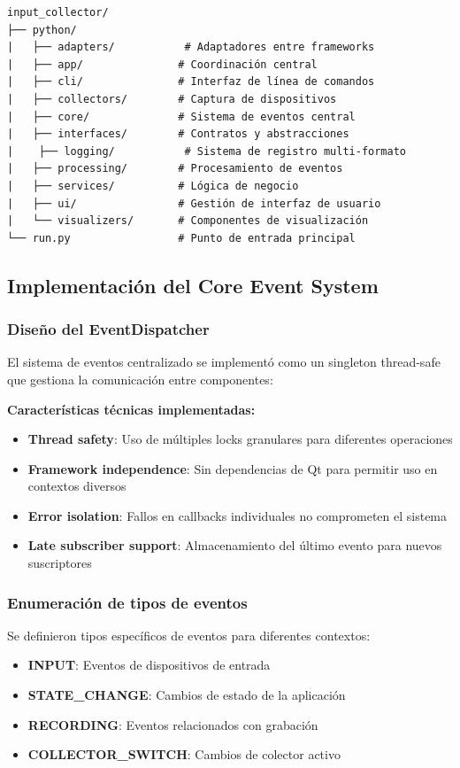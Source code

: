 \begin{verbatim}
input_collector/
├── python/
|   ├── adapters/           # Adaptadores entre frameworks
|   ├── app/               # Coordinación central
|   ├── cli/               # Interfaz de línea de comandos
|   ├── collectors/        # Captura de dispositivos
|   ├── core/              # Sistema de eventos central
|   ├── interfaces/        # Contratos y abstracciones
|    ├── logging/           # Sistema de registro multi-formato
|   ├── processing/        # Procesamiento de eventos
|   ├── services/          # Lógica de negocio
|   ├── ui/                # Gestión de interfaz de usuario
|   └── visualizers/       # Componentes de visualización
└── run.py                 # Punto de entrada principal
\end{verbatim}

\subsection{Implementación del Core Event System}
\label{subsec:implementacion_core_events_input}

\subsubsection{Diseño del EventDispatcher}

El sistema de eventos centralizado se implementó como un singleton thread-safe que gestiona la comunicación entre componentes:

\textbf{Características técnicas implementadas:}
\begin{itemize}
    \item \textbf{Thread safety}: Uso de múltiples locks granulares para diferentes operaciones
    \item \textbf{Framework independence}: Sin dependencias de Qt para permitir uso en contextos diversos
    \item \textbf{Error isolation}: Fallos en callbacks individuales no comprometen el sistema
    \item \textbf{Late subscriber support}: Almacenamiento del último evento para nuevos suscriptores
\end{itemize}

\subsubsection{Enumeración de tipos de eventos}

Se definieron tipos específicos de eventos para diferentes contextos:
\begin{itemize}
    \item \textbf{INPUT}: Eventos de dispositivos de entrada
    \item \textbf{STATE\_CHANGE}: Cambios de estado de la aplicación
    \item \textbf{RECORDING}: Eventos relacionados con grabación
    \item \textbf{COLLECTOR\_SWITCH}: Cambios de colector activo
\end{itemize}

